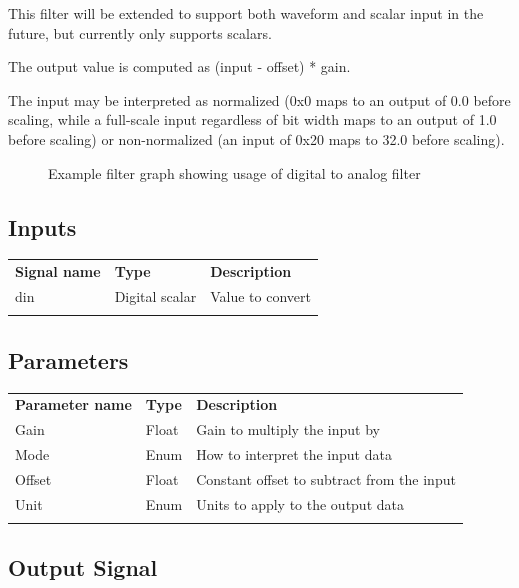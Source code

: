 This filter will be extended to support both waveform and scalar input in the future, but currently only supports
scalars.

The output value is computed as (input - offset) * gain.

The input may be interpreted as normalized (0x0 maps to an output of 0.0 before scaling, while a full-scale input
regardless of bit width maps to an output of 1.0 before scaling) or non-normalized (an input of 0x20 maps to 32.0
before scaling).

\begin{figure}[h]
\centering
{}
\caption{Example filter graph showing usage of digital to analog filter}
\label{filter_digital_analog_graph}
\end{figure}

\subsection{Inputs}

\begin{tabularx}{16cm}{llX}
\thickhline
\textbf{Signal name} & \textbf{Type} & \textbf{Description} \\
\thickhline
din & Digital scalar & Value to convert\\
\thickhline
\end{tabularx}

\subsection{Parameters}

\begin{tabularx}{16cm}{llX}
\thickhline
\textbf{Parameter name} & \textbf{Type} & \textbf{Description} \\
\thickhline
Gain & Float & Gain to multiply the input by\\
\thinhline
Mode & Enum & How to interpret the input data\\
\thinhline
Offset & Float & Constant offset to subtract from the input\\
\thinhline
Unit & Enum & Units to apply to the output data\\
\thickhline
\end{tabularx}

\subsection{Output Signal}

